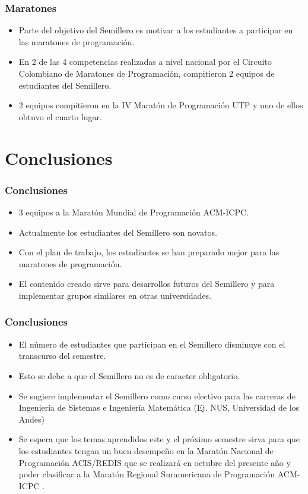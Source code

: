 \documentclass{beamer}
\begin{document}
	\begin{frame}
		\frametitle{Maratones}
		\begin{itemize}
			\item Parte del objetivo del Semillero es motivar a los estudiantes a participar en las maratones de programación.
			\item En 2 de las 4 competencias realizadas a nivel nacional por el Circuito Colombiano de Maratones de Programación, compitieron 2 equipos de estudiantes del Semillero.
			\item 2 equipos compitieron en la IV Maratón de Programación UTP y uno de ellos obtuvo el cuarto lugar.
		\end{itemize}
	\end{frame}
	
	
\section{Conclusiones}
	\begin{frame}
		\frametitle{Conclusiones}
		\begin{itemize}
			\item 3 equipos a la Maratón Mundial de Programación ACM-ICPC.
			\item Actualmente los estudiantes del Semillero son novatos.
			\item Con el plan de trabajo, los estudiantes se han preparado mejor para las maratones de programación.
			\item El contenido creado sirve para desarrollos futuros del Semillero y para implementar grupos similares en otras universidades.
		\end{itemize}
	\end{frame}
	
	\begin{frame}
		\frametitle{Conclusiones}
		\begin{itemize}
			\item El número de estudiantes que participan en el Semillero disminuye con el transcurso del semestre.
			\item Esto se debe a que el Semillero no es de caracter obligatorio.
			\item Se sugiere implementar el Semillero como curso electivo para las carreras de Ingeniería de Sistemas e Ingeniería Matemática (Ej. NUS, Universidad de los Andes)
			\item Se espera que los temas aprendidos este y el próximo semestre sirva para que los estudiantes tengan un buen desempeño en la Maratón Nacional de Programación ACIS/REDIS que se realizará en octubre del presente año y poder clasificar a la Maratón Regional Suramericana de Programación ACM-ICPC .
		\end{itemize}
	\end{frame}
\end{document}

